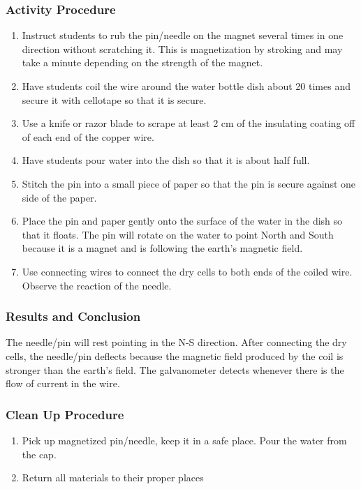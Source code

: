 \subsubsection*{Activity Procedure}
\begin{enumerate}
\item{Instruct students to rub the pin/needle on the magnet several times in one direction without scratching it. This is magnetization by stroking and may take a minute depending on the strength of the magnet.} 
\item{Have students coil the wire around the water bottle dish about 20 times and secure it with cellotape so that it is secure.} 
\item{Use a knife or razor blade to scrape at least 2 cm of the insulating coating off of each end of the copper wire.} 
\item{Have students pour water into the dish so that it is about half full.} 
\item{Stitch the pin into a small piece of paper so that the pin is secure against one side of the paper.} 
\item{Place the pin and paper gently onto the surface of the water in the dish so that it floats. The pin will rotate on the water to point North and South because it is a magnet and is following the earth's magnetic field.} 
\item{Use connecting wires to connect the dry cells to both ends of the coiled wire. Observe the reaction of the needle.} 
\end{enumerate}

\subsubsection*{Results and Conclusion}
The needle/pin will rest pointing in the N-S direction. After connecting the dry cells, the needle/pin deflects because the magnetic field produced by the coil is stronger than the earth's field. The galvanometer detects whenever there is the flow of current in the wire.  

\subsubsection*{Clean Up Procedure}
\begin{enumerate}
\item{Pick up magnetized pin/needle, keep it in a safe place. Pour the water from the cap.} 
\item{Return all materials to their proper places}
\end{enumerate}

